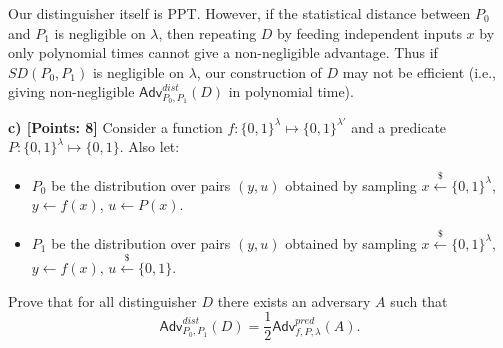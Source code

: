 \documentclass[12pt]{article}
\newcommand{\bits}{\{0,1\}}
\newcommand{\getsr}{\stackrel{\$}{\gets}}
\newcommand{\Adv}{\textsf{Adv}}
\theoremstyle{definition}
\begin{document}
Our distinguisher itself is PPT. However, if the statistical distance between $P_0$ and $P_1$ is negligible on $\lambda$, then repeating $D$ by feeding independent inputs $x$ by only polynomial times cannot give a non-negligible advantage. Thus if $SD(P_0,P_1)$ is negligible on $\lambda$, our construction of $D$ may not be efficient (i.e., giving non-negligible $\Adv_{P_0,P_1}^{dist}(D)$ in polynomial time).

{\bf c) [Points: 8]} Consider a function $f : \bits^\lambda \mapsto \bits^{\lambda'}$ and a predicate $P : \bits^\lambda \mapsto \bits$.
Also let:
\begin{itemize}
\item $P_0$ be the distribution over pairs $(y, u)$ obtained by sampling $x\getsr\bits^\lambda$, $y\gets f(x)$, $u\gets P(x)$.
\item $P_1$ be the distribution over pairs $(y, u)$ obtained by sampling $x\getsr\bits^\lambda$, $y\gets f(x)$, $u\getsr \bits$.
\end{itemize}
Prove that for all distinguisher $D$ there exists an adversary $A$ such that
$$\Adv_{P_0,P_1}^{dist}(D) = \frac{1}{2}\Adv_{f,P,\lambda}^{pred}(A).$$
\end{document}
